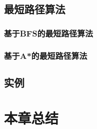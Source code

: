 \subsection{最短路径算法}
\subsubsection{基于BFS的最短路径算法}
\subsubsection{基于A*的最短路径算法}
\subsection{实例}

\section{本章总结}
